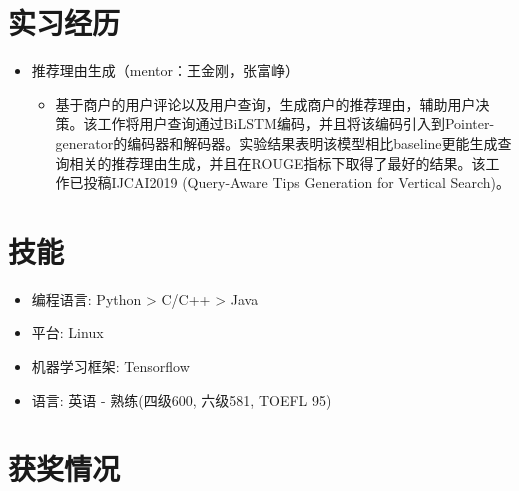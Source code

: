 \documentclass{resume}
\begin{document}
\section{实习经历}
\begin{itemize}
\item 推荐理由生成（mentor：王金刚，张富峥）
\begin{itemize}
	\item 基于商户的用户评论以及用户查询，生成商户的推荐理由，辅助用户决策。该工作将用户查询通过BiLSTM编码，并且将该编码引入到Pointer-generator的编码器和解码器。实验结果表明该模型相比baseline更能生成查询相关的推荐理由生成，并且在ROUGE指标下取得了最好的结果。该工作已投稿IJCAI2019 (Query-Aware Tips Generation for Vertical Search)。
\end{itemize}


\end{itemize}


\section{技能}
\begin{itemize}[parsep=0.5ex]
  \item 编程语言: Python > C/C++ > Java
  \item 平台: Linux
  \item 机器学习框架: Tensorflow
  \item 语言: 英语 - 熟练(四级600, 六级581, TOEFL 95)

\end{itemize}

\section{获奖情况}

%
%
\end{document}
